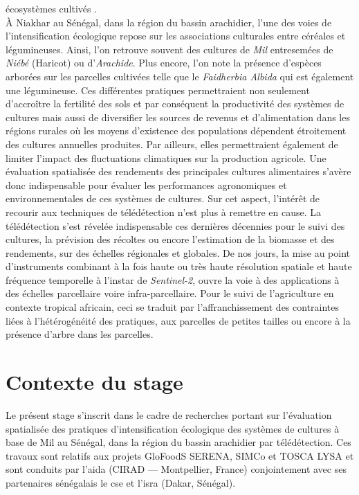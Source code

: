 écosystèmes cultivés \citep{Goulet2012}.\\ \`A Niakhar au Sénégal, dans la région du bassin arachidier, l'une des voies de l'intensification écologique repose sur les associations culturales 
entre céréales et légumineuses. Ainsi, l'on retrouve souvent des cultures de \emph{Mil} entresemées de \emph{Niébé} (Haricot) ou d'\emph{Arachide}. Plus encore, l'on note la 
présence d'espèces arborées sur les parcelles cultivées telle que le \emph{Faidherbia Albida} qui est également une légumineuse. Ces différentes pratiques permettraient non seulement d’accroître la fertilité des 
sols et par conséquent la productivité des systèmes de cultures mais aussi de diversifier les sources de revenus et d’alimentation dans les régions rurales où les moyens d’existence
des populations dépendent étroitement des cultures annuelles produites. Par ailleurs, elles permettraient également de limiter l’impact des fluctuations climatiques sur la 
production agricole. Une évaluation spatialisée des rendements des principales cultures alimentaires s'avère donc indispensable pour évaluer les performances agronomiques et 
environnementales de ces systèmes de cultures. Sur cet aspect, l'intérêt de recourir aux techniques de télédétection n'est plus à remettre en cause. La télédétection s'est révelée 
indispensable ces dernières décennies pour le suivi des cultures, la prévision des récoltes ou encore l'estimation de la biomasse et des rendements, sur des échelles régionales et 
globales. De nos jours, la mise au point d'instruments combinant à la fois haute ou très haute résolution spatiale et haute fréquence temporelle à l'instar de \emph{Sentinel-2}, ouvre la
voie à des applications à des échelles parcellaire voire infra-parcellaire. Pour le suivi de l'agriculture en contexte tropical africain, ceci se traduit par l'affranchissement des contraintes liées à 
l'hétérogénéité des pratiques, aux parcelles de petites tailles ou encore à la présence d’arbre dans les parcelles. 

\section{Contexte du stage}

Le présent stage s'inscrit dans le cadre de recherches portant sur l’évaluation spatialisée des pratiques d’intensification écologique des systèmes de cultures à base de Mil au 
Sénégal, dans la région du bassin arachidier par télédétection. Ces travaux sont relatifs aux projets GloFoodS SERENA, SIMCo et TOSCA LYSA et sont conduits par 
l'\acrshort{aida} (CIRAD --- Montpellier, France) conjointement avec ses partenaires sénégalais le \acrshort{cse} et l'\acrshort{isra} (Dakar, Sénégal).

